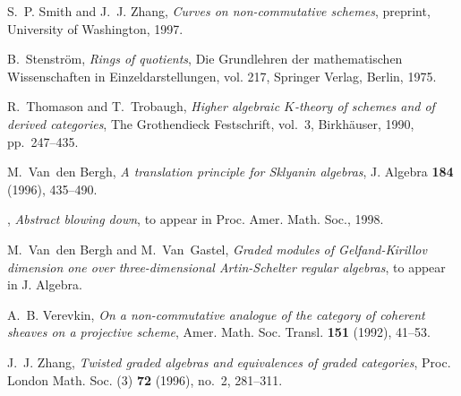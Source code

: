 \documentclass{amsproc}
\theoremstyle{definition}
\theoremstyle{remark}
\numberwithin{equation}{section}
\numberwithin{table}{section}
\numberwithin{figure}{section}
\begin{document}
\begin{thebibliography}{10}
S.~P. Smith and J.~J. Zhang, {\em Curves on non-commutative schemes}, preprint,
  University of Washington, 1997.

B.~Stenstr{\"o}m, {\em Rings of quotients}, Die {G}rundlehren der
  mathematischen {W}issenschaften in {E}inzeldarstellungen, vol. 217, Springer
  Verlag, Berlin, 1975.

R.~Thomason and T.~Trobaugh, {\em Higher algebraic {$K$}-theory of schemes and
  of derived categories}, The Grothendieck Festschrift, vol.~3, Birkh\"auser,
  1990, pp.~247--435.

M.~Van~den Bergh, {\em A translation principle for {S}klyanin algebras}, J.
  Algebra {\bf 184} (1996), 435--490.

\bysame, {\em Abstract blowing down}, to appear in Proc. Amer. Math. Soc.,
  1998.

M.~Van~den Bergh and M.~Van~Gastel, {\em Graded modules of {G}elfand-{K}irillov
  dimension one over three-dimensional {A}rtin-{S}chelter regular algebras}, to
  appear in J. Algebra.

A.~B. Verevkin, {\em On a non-commutative analogue of the category of coherent
  sheaves on a projective scheme}, Amer. Math. Soc. Transl. {\bf 151} (1992),
  41--53.

J.~J. Zhang, {\em Twisted graded algebras and equivalences of graded
  categories}, Proc. London Math. Soc. (3) {\bf 72} (1996), no.~2, 281--311.

\end{thebibliography}



%
%
\end{document}
